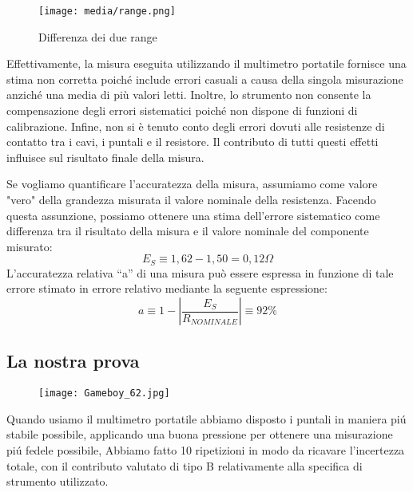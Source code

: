 \begin{figure}[h]
    \centering
    \texttt{[image: media/range.png]}
    \caption{Differenza dei due range}
    \label{fig:range}
\end{figure}

Effettivamente, la misura eseguita utilizzando il multimetro portatile fornisce una stima non corretta poiché include errori casuali a causa della singola misurazione anziché una media di più valori letti. Inoltre, lo strumento non consente la compensazione degli errori sistematici poiché non dispone di funzioni di calibrazione. Infine, non si è tenuto conto degli errori dovuti alle resistenze di contatto tra i cavi, i puntali e il resistore. Il contributo di tutti questi effetti influisce sul risultato finale della misura.

Se vogliamo quantificare l'accuratezza della misura, assumiamo come valore "vero" della grandezza misurata il valore nominale della resistenza. Facendo questa assunzione, possiamo ottenere una stima dell'errore sistematico come differenza tra il risultato della misura e il valore nominale del componente misurato:
\begin{equation}
    E_S \equiv 1,62 - 1,50 = 0,12\Omega
\end{equation}
L’accuratezza relativa “a” di una misura può essere espressa in funzione di tale errore 
stimato in errore relativo mediante la seguente espressione: 
\begin{equation}
     a \equiv 1 - \left| \frac{E_S}{R_{NOMINALE}}\right| \equiv 92\%
\end{equation}


\subsection*{La nostra prova}
\label{sub:nosta_prova_first}
\vspace{0.5cm}
\begin{figure}
    \centering
    \texttt{[image: Gameboy\_62.jpg]}
    \label{fig:mult_port_nostro}
\end{figure}
\FloatBarrier
    

Quando usiamo il multimetro portatile abbiamo disposto i puntali in maniera pi\'u stabile possibile, applicando una buona pressione per ottenere una misurazione pi\'u fedele possibile,
Abbiamo fatto 10 ripetizioni in modo da ricavare l'incertezza totale, con il contributo valutato di tipo B relativamente alla specifica di strumento utilizzato.

